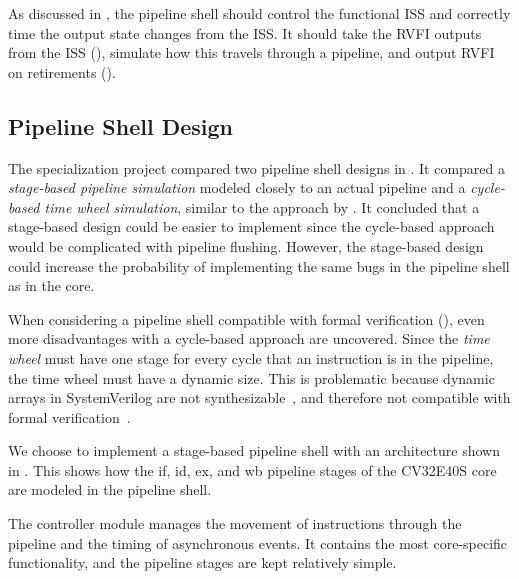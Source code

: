 As discussed in , the pipeline shell should control the functional ISS and correctly time the output state changes from the ISS. It should take the RVFI outputs from the ISS (), simulate how this travels through a pipeline, and output RVFI on retirements ().

\subsection{Pipeline Shell Design}

The specialization project compared two pipeline shell designs in . It compared a \textit{stage-based pipeline simulation} modeled closely to an actual pipeline and a \textit{cycle-based time wheel simulation}, similar to the approach by \textcite{chiangEfficientTwolayeredCycleaccurate2009}. 
It concluded that a stage-based design could be easier to implement since the cycle-based approach would be complicated with pipeline flushing. However, the stage-based design could increase the probability of implementing the same bugs in the pipeline shell as in the core.


When considering a pipeline shell compatible with formal verification (), even more disadvantages with a cycle-based approach are uncovered. 
Since the \textit{time wheel} must have one stage for every cycle that an instruction is in the pipeline, the time wheel must have a dynamic size. This is problematic because dynamic arrays in SystemVerilog are not synthesizable~\cite{mehtaIntroductionSystemVerilog2021}, and therefore not compatible with formal verification~\cite{seligmanFormalVerificationEssential2015}.


We choose to implement a stage-based pipeline shell with an architecture shown in . This shows how the \acrshort{if}, \acrshort{id}, \acrshort{ex}, and \acrshort{wb} pipeline stages of the CV32E40S core are modeled in the pipeline shell. 

The controller module manages the movement of instructions through the pipeline and the timing of asynchronous events. It contains the most core-specific functionality, and the pipeline stages are kept relatively simple. 



